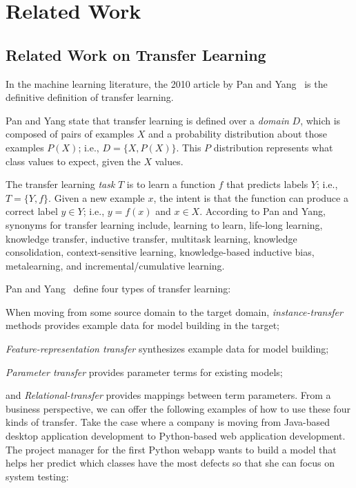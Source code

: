 \section{Related Work}
\subsection{Related Work on Transfer Learning}
In the machine learning literature, the 2010 article by
Pan and Yang~\cite{Pan10} is the definitive definition of
transfer learning.

Pan and Yang state that transfer learning is defined over a {\em domain} $D$,
which is composed of pairs of
examples $X$ and a probability distribution about those examples $P(X)$;
i.e., \mbox{$D = \{ X, P(X) \}$}.
This $P$ distribution represents what class values to expect, given the $X$ values.


The transfer learning {\em task} $T$ is to learn a function $f$ that predicts labels $Y$; i.e.,
$T = \{ Y, f \}$.
Given a new example $x$, the intent is that the function can produce a correct
label $y\in Y$; i.e., $y = f(x)$ and $x\in X$.
According to Pan and Yang, synonyms for transfer learning include, learning
to learn, life-long learning, knowledge transfer, inductive transfer,
multitask learning, knowledge consolidation, context-sensitive
learning, knowledge-based inductive bias, metalearning, and
incremental/cumulative learning.

Pan and Yang~\cite{Pan10} define four types of transfer learning:
\squishlist
\item
When moving from some source domain    to the target domain,   {\em instance-transfer} methods
provides example data for model building in the target;
\item
{\em Feature-representation transfer} synthesizes example data for
model building;
\item
{\em Parameter transfer} provides parameter terms for existing models;
\item
and {\em Relational-transfer} provides mappings between term parameters.
\squishend
From a business perspective, we can offer the following examples of
how to use these four kinds of transfer. Take the case where a company
is moving from Java-based desktop application development to
Python-based web application development. The project manager for the
first Python webapp wants to build a model that helps her predict
which classes have the most defects so that she can focus on system
testing:

